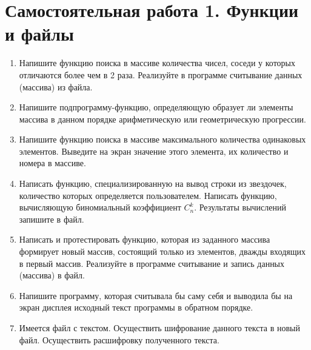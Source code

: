 \section{Самостоятельная работа 1. Функции и файлы}
\begin{enumerate}[leftmargin=*]
    \item Напишите функцию поиска в массиве количества чисел, соседи у которых отличаются более чем в 2 раза. Реализуйте в программе считывание данных (массива) из файла.
    \item Напишите подпрограмму-функцию, определяющую образует ли элементы массива в данном порядке арифметическую или геометрическую прогрессии.
    \item Напишите функцию поиска в массиве максимального количества одинаковых элементов. Выведите на экран значение этого элемента, их количество и номера в массиве.
    \item Написать функцию, специализированную на вывод строки из звездочек, количество которых определяется пользователем.
    Написать функцию, вычисляющую биномиальный коэффициент $C_n^k$. Результаты вычислений запишите в файл.
    \item Написать и протестировать функцию, которая из заданного массива формирует новый массив, состоящий только из элементов, дважды входящих в первый массив. Реализуйте в программе считывание и запись данных (массива) в файл.
    \item Напишите программу, которая считывала бы саму себя и выводила бы на экран дисплея исходный текст программы в обратном порядке.
    \item Имеется файл с текстом. Осуществить шифрование данного текста в новый файл. Осуществить расшифровку полученного текста.
\end{enumerate}

